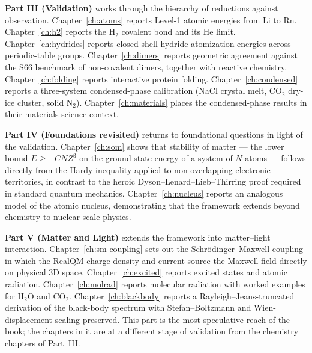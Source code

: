 \textbf{Part III (Validation)} works through the hierarchy of reductions against observation. Chapter~\ref{ch:atoms} reports Level-1 atomic energies from Li to Rn. Chapter~\ref{ch:h2} reports the H$_2$ covalent bond and its He limit. Chapter~\ref{ch:hydrides} reports closed-shell hydride atomization energies across periodic-table groups. Chapter~\ref{ch:dimers} reports geometric agreement against the S66 benchmark of non-covalent dimers, together with reactive chemistry. Chapter~\ref{ch:folding} reports interactive protein folding. Chapter~\ref{ch:condensed} reports a three-system condensed-phase calibration (NaCl crystal melt, CO$_2$ dry-ice cluster, solid N$_2$). Chapter~\ref{ch:materials} places the condensed-phase results in their materials-science context.

\textbf{Part IV (Foundations revisited)} returns to foundational questions in light of the validation. Chapter~\ref{ch:som} shows that stability of matter --- the lower bound $E \ge -CNZ^3$ on the ground-state energy of a system of $N$ atoms --- follows directly from the Hardy inequality applied to non-overlapping electronic territories, in contrast to the heroic Dyson--Lenard--Lieb--Thirring proof required in standard quantum mechanics. Chapter~\ref{ch:nucleus} reports an analogous model of the atomic nucleus, demonstrating that the framework extends beyond chemistry to nuclear-scale physics.

\textbf{Part V (Matter and Light)} extends the framework into matter--light interaction. Chapter~\ref{ch:sm-coupling} sets out the Schr\"odinger--Maxwell coupling in which the RealQM charge density and current source the Maxwell field directly on physical 3D space. Chapter~\ref{ch:excited} reports excited states and atomic radiation. Chapter~\ref{ch:molrad} reports molecular radiation with worked examples for H$_2$O and CO$_2$. Chapter~\ref{ch:blackbody} reports a Rayleigh--Jeans-truncated derivation of the black-body spectrum with Stefan--Boltzmann and Wien-displacement scaling preserved. This part is the most speculative reach of the book; the chapters in it are at a different stage of validation from the chemistry chapters of Part~III.


